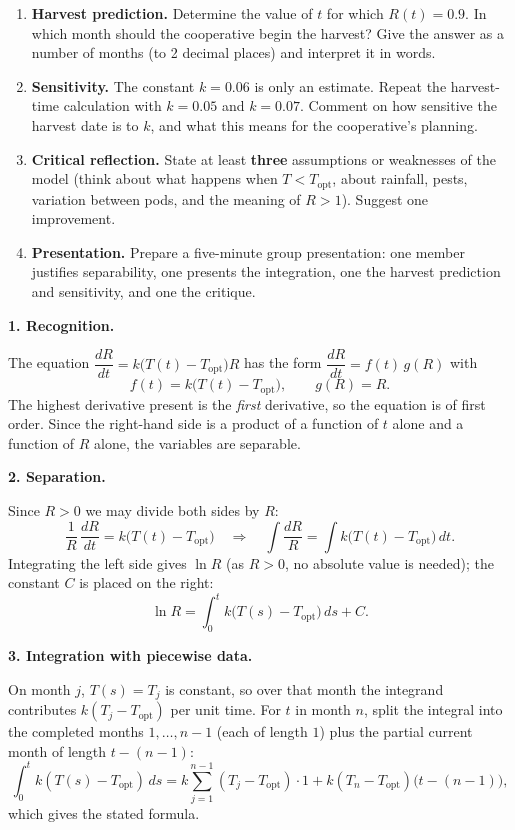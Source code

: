 \documentclass[11pt]{article}
\newcommand{\cle}[1]{{\popxbold\color{popdark}#1}}
\newcounter{popsec}
\newcounter{popsub}
\newcommand{\courssub}[1]{%
  \stepcounter{popsub}%
  \par\vspace{9pt}\noindent{\popxbold\fontsize{11.5}{13}\selectfont\color{popink}{\color{poporange}\thepopsec.\thepopsub}\hspace{6pt}#1}\par\nopagebreak\vspace{4pt}
}
\begin{document}
\begin{enumerate}
\item \textbf{Harvest prediction.} Determine the value of $t$ for which $R(t)=0.9$. In which month should the cooperative begin the harvest? Give the answer as a number of months (to 2 decimal places) and interpret it in words.

\item \textbf{Sensitivity.} The constant $k=0.06$ is only an estimate. Repeat the harvest-time calculation with $k=0.05$ and $k=0.07$. Comment on how sensitive the harvest date is to $k$, and what this means for the cooperative's planning.

\item \textbf{Critical reflection.} State at least \textbf{three} assumptions or weaknesses of the model (think about what happens when $T<T_{\mathrm{opt}}$, about rainfall, pests, variation between pods, and the meaning of $R>1$). Suggest one improvement.

\item \textbf{Presentation.} Prepare a five-minute group presentation: one member justifies separability, one presents the integration, one the harvest prediction and sensitivity, and one the critique.
\end{enumerate}

\courssub{Model answer}

\textbf{1. Recognition.}\par
The equation $\dfrac{dR}{dt}=k\bigl(T(t)-T_{\mathrm{opt}}\bigr)R$ has the form $\dfrac{dR}{dt}=f(t)\,g(R)$ with
\[
f(t)=k\bigl(T(t)-T_{\mathrm{opt}}\bigr),\qquad g(R)=R.
\]
The highest derivative present is the \emph{first} derivative, so the equation is of \cle{first order}. Since the right-hand side is a product of a function of $t$ alone and a function of $R$ alone, the variables are \cle{separable}.

\textbf{2. Separation.}\par
Since $R>0$ we may divide both sides by $R$:
\[
\frac{1}{R}\,\frac{dR}{dt}=k\bigl(T(t)-T_{\mathrm{opt}}\bigr)
\quad\Longrightarrow\quad
\int\frac{dR}{R}=\int k\bigl(T(t)-T_{\mathrm{opt}}\bigr)\,dt.
\]
Integrating the left side gives $\ln R$ (as $R>0$, no absolute value is needed); the constant $C$ is placed on the right:
\[
\ln R = \int_0^t k\bigl(T(s)-T_{\mathrm{opt}}\bigr)\,ds + C.
\]

\textbf{3. Integration with piecewise data.}\par
On month $j$, $T(s)=T_j$ is constant, so over that month the integrand contributes $k(T_j-T_{\mathrm{opt}})$ per unit time. For $t$ in month $n$, split the integral into the completed months $1,\dots,n-1$ (each of length $1$) plus the partial current month of length $t-(n-1)$:
\[
\int_0^t k(T(s)-T_{\mathrm{opt}})\,ds
= k\sum_{j=1}^{n-1}(T_j-T_{\mathrm{opt}})\cdot 1 + k(T_n-T_{\mathrm{opt}})\bigl(t-(n-1)\bigr),
\]
which gives the stated formula.
\end{document}
